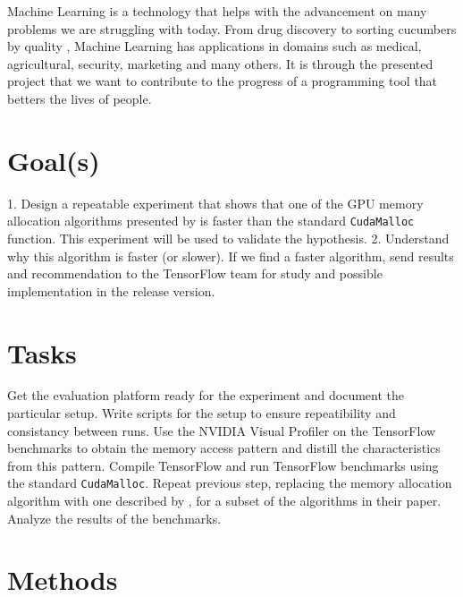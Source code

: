 \documentclass[12pt,twoside]{article}
\begin{document}
Machine Learning is a technology that helps with the advancement on many problems we are struggling with today. From drug discovery \cite{Ramsundar_Kearnes_Riley_Webster_Konerding_Pande_2015} to sorting cucumbers by quality \cite{cucumber}, Machine Learning has applications in domains such as medical, agricultural, security, marketing and many others. It is through the presented project that we want to contribute to the progress of a programming tool that betters the lives of people.

\section{Goal(s)}
\label{sec:goal(s)}


1. Design a repeatable experiment that shows that one of the GPU memory allocation algorithms presented by \citeauthor{Vinkler2015} \cite{Vinkler2015} is faster than the standard \texttt{CudaMalloc} function. This experiment will be used to validate the hypothesis. 2. Understand why this algorithm is faster (or slower).
If we find a faster algorithm, send results and recommendation to the TensorFlow team for study and possible implementation in the release version.

\section{Tasks}
\label{sec:tasks}


Get the evaluation platform ready for the experiment and document the particular setup.
Write scripts for the setup to ensure repeatibility and consistancy between runs.
Use the NVIDIA Visual Profiler on the TensorFlow benchmarks to obtain the memory access pattern and distill the characteristics from this pattern.
Compile TensorFlow and run TensorFlow benchmarks using the standard \texttt{CudaMalloc}.
Repeat previous step, replacing the memory allocation algorithm with one described by \citeauthor{Vinkler2015} \cite{Vinkler2015}, for a subset of the algorithms in their paper.
Analyze the results of the benchmarks.

\section{Methods}
\label{sec:methods}
\end{document}
